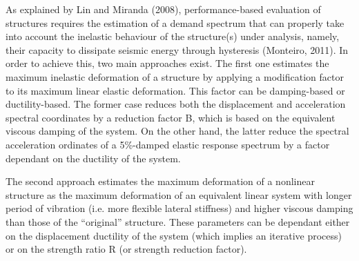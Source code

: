 As explained by Lin and Miranda (2008), performance-based evaluation of structures requires the estimation of a demand spectrum that can properly take into account the inelastic behaviour of the structure(s) under analysis, namely, their capacity to dissipate seismic energy through hysteresis (Monteiro, 2011). In order to achieve this, two main approaches exist. The first one estimates the maximum inelastic deformation of a structure by applying a modification factor to its maximum linear elastic deformation. This factor can be damping-based or ductility-based. The former case reduces both the displacement and acceleration spectral coordinates by a reduction factor B, which is based on the equivalent viscous damping of the system. On the other hand, the latter reduce the spectral acceleration ordinates of a 5\%-damped elastic response spectrum by a factor dependant on the ductility of the system.  

The second approach estimates the maximum deformation of a nonlinear structure as the maximum deformation of an equivalent linear system with longer period of vibration (i.e. more flexible lateral stiffness) and higher viscous damping than those of the “original” structure. These parameters can be dependant either on the displacement ductility of the system (which implies an iterative process) or on the strength ratio R (or strength reduction factor). 